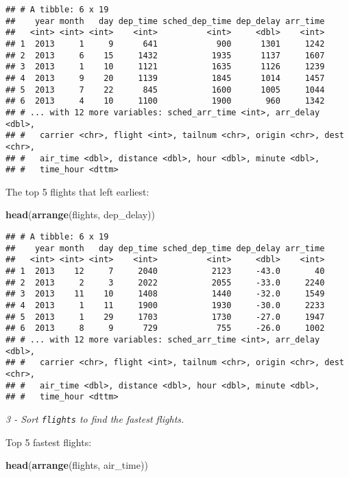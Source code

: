 \documentclass[]{article}
\newenvironment{Shaded}{\begin{snugshade}}{\end{snugshade}}
\newcommand{\KeywordTok}[1]{\textcolor[rgb]{0.13,0.29,0.53}{\textbf{#1}}}
\newcommand{\NormalTok}[1]{#1}
\theoremstyle{definition}
\theoremstyle{definition}
\theoremstyle{definition}
\theoremstyle{remark}
\begin{document}
\begin{verbatim}
## # A tibble: 6 x 19
##    year month   day dep_time sched_dep_time dep_delay arr_time
##   <int> <int> <int>    <int>          <int>     <dbl>    <int>
## 1  2013     1     9      641            900      1301     1242
## 2  2013     6    15     1432           1935      1137     1607
## 3  2013     1    10     1121           1635      1126     1239
## 4  2013     9    20     1139           1845      1014     1457
## 5  2013     7    22      845           1600      1005     1044
## 6  2013     4    10     1100           1900       960     1342
## # ... with 12 more variables: sched_arr_time <int>, arr_delay <dbl>,
## #   carrier <chr>, flight <int>, tailnum <chr>, origin <chr>, dest <chr>,
## #   air_time <dbl>, distance <dbl>, hour <dbl>, minute <dbl>,
## #   time_hour <dttm>
\end{verbatim}

The top 5 flights that left earliest:

\begin{Shaded}
\begin{Highlighting}[]
\KeywordTok{head}\NormalTok{(}\KeywordTok{arrange}\NormalTok{(flights, dep_delay))}
\end{Highlighting}
\end{Shaded}

\begin{verbatim}
## # A tibble: 6 x 19
##    year month   day dep_time sched_dep_time dep_delay arr_time
##   <int> <int> <int>    <int>          <int>     <dbl>    <int>
## 1  2013    12     7     2040           2123     -43.0       40
## 2  2013     2     3     2022           2055     -33.0     2240
## 3  2013    11    10     1408           1440     -32.0     1549
## 4  2013     1    11     1900           1930     -30.0     2233
## 5  2013     1    29     1703           1730     -27.0     1947
## 6  2013     8     9      729            755     -26.0     1002
## # ... with 12 more variables: sched_arr_time <int>, arr_delay <dbl>,
## #   carrier <chr>, flight <int>, tailnum <chr>, origin <chr>, dest <chr>,
## #   air_time <dbl>, distance <dbl>, hour <dbl>, minute <dbl>,
## #   time_hour <dttm>
\end{verbatim}

\emph{3 - Sort \texttt{flights} to find the fastest flights.}

Top 5 fastest flights:

\begin{Shaded}
\begin{Highlighting}[]
\KeywordTok{head}\NormalTok{(}\KeywordTok{arrange}\NormalTok{(flights, air_time))}
\end{Highlighting}
\end{Shaded}
\end{document}
